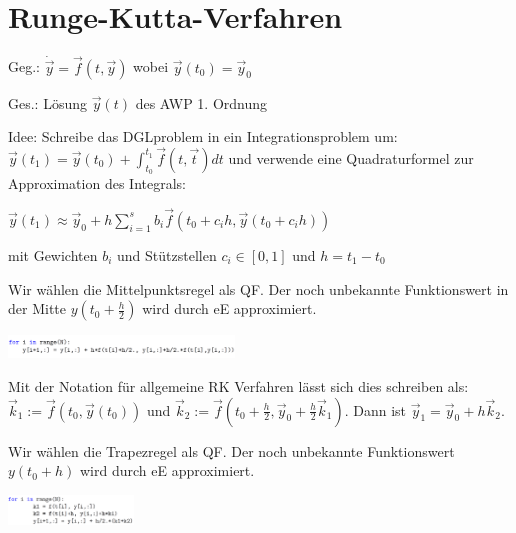 \section{Runge-Kutta-Verfahren}

\vspace{1\baselineskip}

Geg.: $\dot{\vec{y}} = \vec{f}(t,\vec{y})$ wobei $\vec{y} (t_0) = \vec{y}_0$

Ges.: Lösung $\vec{y}(t)$ des AWP 1. Ordnung

Idee: Schreibe das DGLproblem in ein Integrationsproblem um:
$\vec{y}(t_1) = \vec{y}(t_0) + \int_{t_0}^{t_1} \vec{f}(t,\vec{t}) dt$ und verwende eine
Quadraturformel zur Approximation des Integrals:

$\vec{y} (t_1) \approx \vec{y}_0 + h \sum_{i=1}^s b_i \vec{f}(t_0 + c_i h , \vec{y} (t_0 + c_i h))$

mit Gewichten $b_i$ und Stützstellen $c_i \in [0,1]$ und $h=t_1-t_0$

\pagebreak


Wir wählen die Mittelpunktsregel als QF. Der noch unbekannte Funktionswert in der
Mitte $y(t_0 + \frac{h}{2})$ wird durch eE approximiert.

\begin{center}
    \includegraphics[width=0.45\textwidth]{Figures/RK_eM.png}
\end{center}

Mit der Notation für allgemeine RK Verfahren lässt sich dies schreiben als:
$\vec{k}_1 := \vec{f}(t_0,\vec{y}(t_0))$ und
$\vec{k}_2 := \vec{f}(t_0 + \frac{h}{2} , \vec{y}_0 + \frac{h}{2} \vec{k}_1)$.
Dann ist $\vec{y}_1 = \vec{y}_0 + h \vec{k}_2$.

\vspace{1\baselineskip}


Wir wählen die Trapezregel als QF. Der noch unbekannte Funktionswert $y(t_0 + h)$ wird
durch eE approximiert.

\begin{center}
    \includegraphics[width=0.25\textwidth]{Figures/RK_eT.png}
\end{center}

